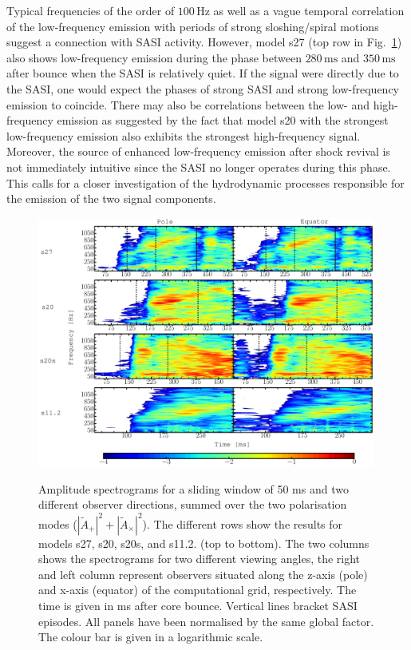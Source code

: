 Typical frequencies of the order of $100 \, \mathrm{Hz}$ as well as a
vague temporal correlation of the low-frequency emission with periods
of strong sloshing/spiral motions suggest a connection with
SASI activity. However, model s27 (top row in
Fig.~\ref{fig:spectrograms}) also shows low-frequency emission during
the phase between $280 \, \mathrm{ms}$ and $350 \, \mathrm{ms}$ after
bounce when the SASI is relatively quiet. If the signal were
directly due to the SASI, one would expect the phases of strong SASI
and strong low-frequency emission to coincide. There may also be
correlations between the low- and high-frequency emission as suggested
by the fact that model s20 with the strongest
low-frequency emission also exhibits the strongest high-frequency
signal. Moreover, the source of enhanced low-frequency emission after
shock revival is not immediately intuitive since the SASI no longer
operates during this phase.  This calls for a closer investigation of
the hydrodynamic processes responsible for the emission of the two
signal components.

\begin{figure}
\includegraphics[width=0.99\textwidth]{./images/chp1/fig3.pdf} \\
\caption{Amplitude spectrograms for a sliding window of 50 ms and two different observer
  directions, summed over the two polarisation modes 
  ($|\widetilde{A}_+|^2 + |\widetilde{A}_\times|^2$). The
  different rows show the results for models s27, s20, s20s, and s11.2. (top to bottom).
  The two columns shows the spectrograms for two different viewing angles, the right and left column represent
  observers situated along the z-axis (pole) and x-axis (equator) of the computational grid, respectively.
  The time is given in ms after core bounce. Vertical lines bracket SASI episodes. All panels have been normalised by the same global factor.
  The colour bar is given in a logarithmic scale.
\label{fig:spectrograms}}
\end{figure}

